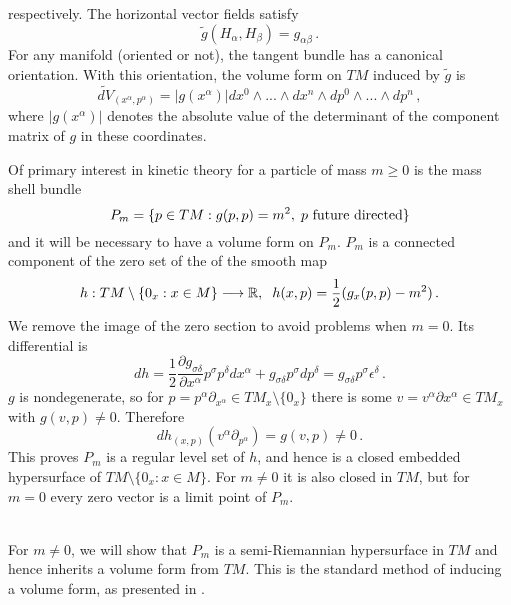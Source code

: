 respectively.  The horizontal vector fields satisfy
\begin{equation}
\tilde{g}(H_\alpha,H_\beta)=g_{\alpha\beta}\,.
\end{equation}
For any manifold (oriented or not), the tangent bundle has a canonical orientation.  With this orientation, the volume form on $TM$ induced by $\tilde{g}$ is
\begin{equation}
\widetilde{dV}_{(x^\alpha,p^{\alpha})}=|g(x^\alpha)|dx^0\wedge...\wedge dx^n\wedge dp^0\wedge...\wedge dp^n\,,
\end{equation}
where $|g(x^\alpha)|$ denotes the absolute value of the determinant of the component matrix of $g$ in these coordinates.

Of primary interest in kinetic theory for a particle of mass $m\geq 0$ is the mass shell bundle
\begin{equation}
P_m=\{p\in TM :g(p,p)=m^2,\hspace{1mm}  p\text{ future directed}\}
\end{equation}
and it will be necessary to have a volume form on $P_m$.  $P_m$ is a connected component of the zero set of the of the smooth map 
\begin{equation}\label{defining_function}
h:TM\setminus \{0_x:x\in M\}\longrightarrow \mathbb{R},\hspace{2mm} h(x,p)= \frac{1}{2}(g_x(p,p)-m^2)\,.  
\end{equation} 
We remove the image of the zero section to avoid problems when $m=0$.  Its differential is
\begin{equation}\label{dh}
dh=\frac{1}{2}\frac{\partial g_{\sigma\delta}}{\partial x^\alpha}p^\sigma p^\delta dx^\alpha+g_{\sigma\delta}p^\sigma dp^\delta=g_{\sigma\delta}p^\sigma\epsilon^\delta\,.
\end{equation}
$g$ is nondegenerate, so for $p=p^{\alpha}\partial_{x^\alpha}\in TM_x\setminus{\{0_x\}}$ there is some $v=v^\alpha\partial{x^\alpha}\in TM_x$ with $g(v,p)\neq 0$.  Therefore
\begin{equation}
dh_{(x,p)}(v^\alpha\partial_{p^\alpha})=g(v,p)\neq 0\,.
\end{equation}
This proves $P_m$ is a regular level set of $h$, and hence is a closed embedded hypersurface of $TM\setminus \{0_x:x\in M\}$.  For $m\neq 0$ it is also closed in $TM$, but for $m=0$ every zero vector is a limit point of $P_m$.

\\
For $m\neq 0$, we will show that $P_m$ is a semi-Riemannian hypersurface in $TM$ and hence inherits a volume form from $TM$. This is the standard method of inducing a volume form, as presented in \cite{tsamparlis}.  


